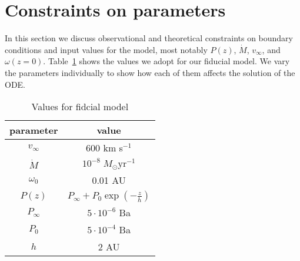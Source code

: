 \section{Constraints on parameters}
\label{sect:parameters}
In this section we discuss observational and theoretical constraints on boundary conditions and input values for the model, most notably $P(z)$, $\dot M$, $v_\infty$, and $\omega(z=0)$. Table~\ref{tab:fiducial} shows the values we adopt for our fiducial model. We vary the parameters individually to show how each of them affects the solution of the ODE. 
\begin{table}
\label{tab:fiducial}
\caption{Values for fidcial model}
\begin{tabular}{cc}
\hline\hline
parameter & value\\
\hline
$v_\infty$ & 600 km s$^{-1}$\\
$\dot M$ & $10^{-8}\;M_\odot\textrm{yr}^{-1}$\\
$\omega_0$ & 0.01 AU\\
$P(z)$ & $P_\infty+P_0\exp\left(-\frac{z}{h}\right)$\\
$P_\infty$ & $5\cdot 10^{-6}$ Ba\\
$P_0$ & $5\cdot 10^{-4}$ Ba\\
$h$ & 2 AU\\
\hline
\end{tabular}
\end{table}